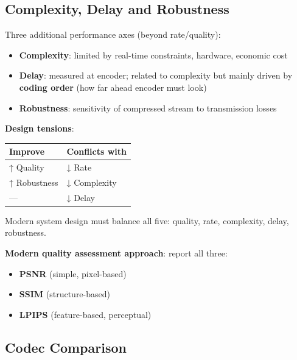 \subsection{Complexity, Delay and Robustness}

Three additional performance axes (beyond rate/quality):

\begin{itemize}
\item \textbf{Complexity}: limited by real-time constraints, hardware, economic cost
\item \textbf{Delay}: measured at encoder; related to complexity but mainly driven by \textbf{coding order} (how far ahead encoder must look)
\item \textbf{Robustness}: sensitivity of compressed stream to transmission losses
\end{itemize}

\textbf{Design tensions}:

\begin{center}
\begin{tabular}{|l|l|}
\hline
\textbf{Improve} & \textbf{Conflicts with} \\ \hline
↑ Quality & ↓ Rate \\ \hline
↑ Robustness & ↓ Complexity \\ \hline
— & ↓ Delay \\ \hline
\end{tabular}
\end{center}

Modern system design must balance all five: quality, rate, complexity, delay, robustness.

\textbf{Modern quality assessment approach}: report all three:
\begin{itemize}
\item \textbf{PSNR} (simple, pixel-based)
\item \textbf{SSIM} (structure-based)
\item \textbf{LPIPS} (feature-based, perceptual)
\end{itemize}

\subsection{Codec Comparison}

